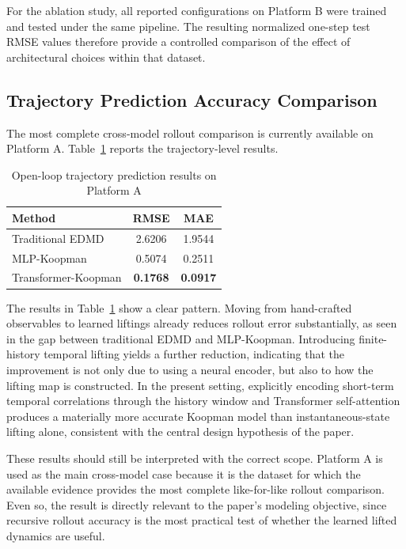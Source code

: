 \documentclass[journal]{IEEEtran}
\begin{document}
For the ablation study, all reported configurations on Platform B were trained and tested under the same pipeline. The resulting normalized one-step test RMSE values therefore provide a controlled comparison of the effect of architectural choices within that dataset.

\subsection{Trajectory Prediction Accuracy Comparison}

The most complete cross-model rollout comparison is currently available on Platform A. Table~\ref{tab:prediction_platform_a} reports the trajectory-level results.

\begin{table}[!t]
\renewcommand{\arraystretch}{1.2}
\caption{Open-loop trajectory prediction results on Platform A}
\label{tab:prediction_platform_a}
\centering
\begin{tabular}{lcc}
\hline\hline
Method & RMSE & MAE \\
\hline
Traditional EDMD & 2.6206 & 1.9544 \\
MLP-Koopman & 0.5074 & 0.2511 \\
Transformer-Koopman & \textbf{0.1768} & \textbf{0.0917} \\
\hline\hline
\end{tabular}
\end{table}

The results in Table~\ref{tab:prediction_platform_a} show a clear pattern. Moving from hand-crafted observables to learned liftings already reduces rollout error substantially, as seen in the gap between traditional EDMD and MLP-Koopman. Introducing finite-history temporal lifting yields a further reduction, indicating that the improvement is not only due to using a neural encoder, but also to how the lifting map is constructed. In the present setting, explicitly encoding short-term temporal correlations through the history window and Transformer self-attention produces a materially more accurate Koopman model than instantaneous-state lifting alone, consistent with the central design hypothesis of the paper.

These results should still be interpreted with the correct scope. Platform A is used as the main cross-model case because it is the dataset for which the available evidence provides the most complete like-for-like rollout comparison. Even so, the result is directly relevant to the paper's modeling objective, since recursive rollout accuracy is the most practical test of whether the learned lifted dynamics are useful.
\end{document}
